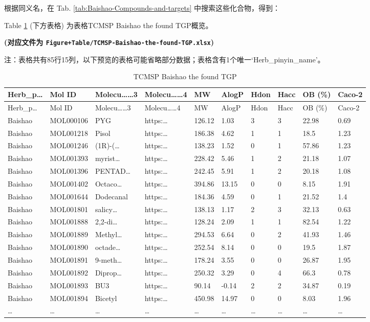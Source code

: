 \documentclass[
]{article}
\begin{document}
根据同义名，在 Tab. \ref{tab:Baishao-Compounds-and-targets} 中搜索这些化合物，得到：

Table \ref{tab:TCMSP-Baishao-the-found-TGP} (下方表格) 为表格TCMSP Baishao the found TGP概览。

\textbf{(对应文件为 \texttt{Figure+Table/TCMSP-Baishao-the-found-TGP.xlsx})}

\begin{center}\begin{tcolorbox}[colback=gray!10, colframe=gray!50, width=0.9\linewidth, arc=1mm, boxrule=0.5pt]注：表格共有85行15列，以下预览的表格可能省略部分数据；表格含有1个唯一`Herb\_pinyin\_name'。
\end{tcolorbox}
\end{center}

\begin{longtable}[]{@{}llllllllll@{}}
\caption{\label{tab:TCMSP-Baishao-the-found-TGP}TCMSP Baishao the found TGP}\tabularnewline
\toprule
Herb\_p\ldots{} & Mol ID & Molecu\ldots\ldots3 & Molecu\ldots\ldots4 & MW & AlogP & Hdon & Hacc & OB (\%) & Caco-2\tabularnewline
\midrule
\endfirsthead
\toprule
Herb\_p\ldots{} & Mol ID & Molecu\ldots\ldots3 & Molecu\ldots\ldots4 & MW & AlogP & Hdon & Hacc & OB (\%) & Caco-2\tabularnewline
\midrule
\endhead
Baishao & MOL000106 & PYG & https:\ldots{} & 126.12 & 1.03 & 3 & 3 & 22.98 & 0.69\tabularnewline
Baishao & MOL001218 & Pisol & https:\ldots{} & 186.38 & 4.62 & 1 & 1 & 18.5 & 1.23\tabularnewline
Baishao & MOL001246 & (1R)-(\ldots{} & https:\ldots{} & 138.23 & 1.52 & 0 & 1 & 57.86 & 1.23\tabularnewline
Baishao & MOL001393 & myrist\ldots{} & https:\ldots{} & 228.42 & 5.46 & 1 & 2 & 21.18 & 1.07\tabularnewline
Baishao & MOL001396 & PENTAD\ldots{} & https:\ldots{} & 242.45 & 5.91 & 1 & 2 & 20.18 & 1.08\tabularnewline
Baishao & MOL001402 & Octaco\ldots{} & https:\ldots{} & 394.86 & 13.15 & 0 & 0 & 8.15 & 1.91\tabularnewline
Baishao & MOL001644 & Dodecanal & https:\ldots{} & 184.36 & 4.59 & 0 & 1 & 21.52 & 1.4\tabularnewline
Baishao & MOL001801 & salicy\ldots{} & https:\ldots{} & 138.13 & 1.17 & 2 & 3 & 32.13 & 0.63\tabularnewline
Baishao & MOL001888 & 2,2-di\ldots{} & https:\ldots{} & 128.24 & 2.09 & 1 & 1 & 82.54 & 1.22\tabularnewline
Baishao & MOL001889 & Methyl\ldots{} & https:\ldots{} & 294.53 & 6.64 & 0 & 2 & 41.93 & 1.46\tabularnewline
Baishao & MOL001890 & octade\ldots{} & https:\ldots{} & 252.54 & 8.14 & 0 & 0 & 19.5 & 1.87\tabularnewline
Baishao & MOL001891 & 9-meth\ldots{} & https:\ldots{} & 178.24 & 3.55 & 0 & 0 & 26.87 & 1.95\tabularnewline
Baishao & MOL001892 & Diprop\ldots{} & https:\ldots{} & 250.32 & 3.29 & 0 & 4 & 66.3 & 0.78\tabularnewline
Baishao & MOL001893 & BU3 & https:\ldots{} & 90.14 & -0.14 & 2 & 2 & 34.87 & 0.19\tabularnewline
Baishao & MOL001894 & Bicetyl & https:\ldots{} & 450.98 & 14.97 & 0 & 0 & 8.03 & 1.96\tabularnewline
\ldots{} & \ldots{} & \ldots{} & \ldots{} & \ldots{} & \ldots{} & \ldots{} & \ldots{} & \ldots{} & \ldots{}\tabularnewline
\bottomrule
\end{longtable}
\end{document}
